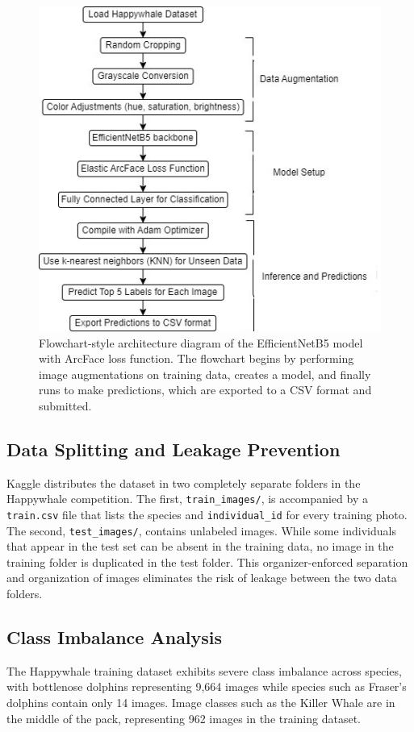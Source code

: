 \documentclass[twocolumn]{article}
\begin{document}
\begin{figure}
    \centering
    \includegraphics[width=0.7\linewidth]{model3.jpg}
    \caption{Flowchart-style architecture diagram of the EfficientNetB5 model with ArcFace loss function. The flowchart begins by performing image augmentations on training data, creates a model, and finally runs to make predictions, which are exported to a CSV format and submitted.}
\end{figure}

\subsection{Data Splitting and Leakage Prevention}

Kaggle distributes the dataset in two completely separate folders in the Happywhale competition. The first, \texttt{train\_images/}, is accompanied by a \texttt{train.csv} file that lists the species and \texttt{individual\_id} for every training photo. The second, \texttt{test\_images/}, contains unlabeled images. While some individuals that appear in the test set can be absent in the training data, no image in the training folder is duplicated in the test folder. This organizer-enforced separation and organization of images eliminates the risk of leakage between the two data folders.  

\subsection{Class Imbalance Analysis}

The Happywhale training dataset exhibits severe class imbalance across species, with bottlenose dolphins representing 9,664 images while species such as Fraser's dolphins contain only 14 images.  Image classes such as the Killer Whale are in the middle of the pack, representing 962 images in the training dataset. 
\end{document}
